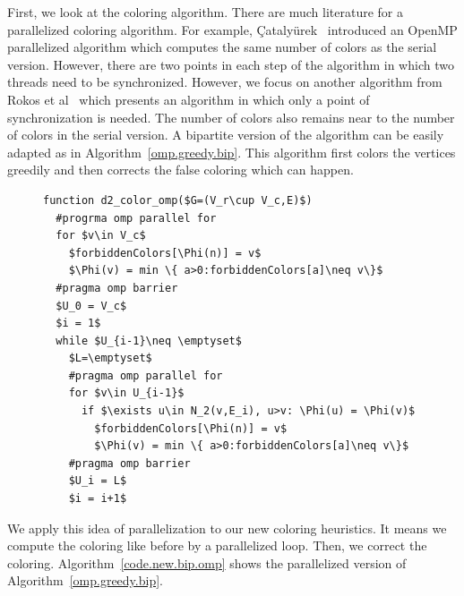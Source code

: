 \documentclass[12pt, twoside,a4paper,toc=bibliography]{scrbook}
\newcommand{\coderef}[1]{Algorithm~\protect\ref{#1}}
\begin{document}
First, we look at the coloring algorithm.
There are much literature for a parallelized coloring algorithm.
For example,
{\c{C}}ataly{\"{u}}rek~\cite{cataly2012} introduced an OpenMP parallelized
algorithm which computes the same number of colors as the serial version.
However, there are two points in each step of the algorithm in which two threads
need to be synchronized.
However, we focus on another algorithm from Rokos et al~\cite{Rokos2015}
which presents an algorithm in which only a point of synchronization is
needed. The number of colors also remains near to the number of colors
in the serial version. A bipartite version of the algorithm can be easily
adapted as in \coderef{omp.greedy.bip}. This algorithm first colors the vertices
greedily and then corrects the false coloring which can happen.
\begin{figure}
\begin{lstlisting}[caption=A OpenMP parallelized version of greedy algorithm
adapted for the bipartite graph.,label=omp.greedy.bip,mathescape]
function d2_color_omp($G=(V_r\cup V_c,E)$)
  #progrma omp parallel for
  for $v\in V_c$
    $forbiddenColors[\Phi(n)] = v$
    $\Phi(v) = min \{ a>0:forbiddenColors[a]\neq v\}$
  #pragma omp barrier
  $U_0 = V_c$
  $i = 1$
  while $U_{i-1}\neq \emptyset$
    $L=\emptyset$
    #pragma omp parallel for
    for $v\in U_{i-1}$
      if $\exists u\in N_2(v,E_i), u>v: \Phi(u) = \Phi(v)$
        $forbiddenColors[\Phi(n)] = v$
        $\Phi(v) = min \{ a>0:forbiddenColors[a]\neq v\}$
    #pragma omp barrier
    $U_i = L$
    $i = i+1$
\end{lstlisting}
\end{figure}
We apply this idea of parallelization to our new coloring heuristics.
It means we compute the coloring like before by a parallelized loop.
Then, we correct the coloring. \coderef{code.new.bip.omp} shows the parallelized
version of \coderef{omp.greedy.bip}.
\end{document}
